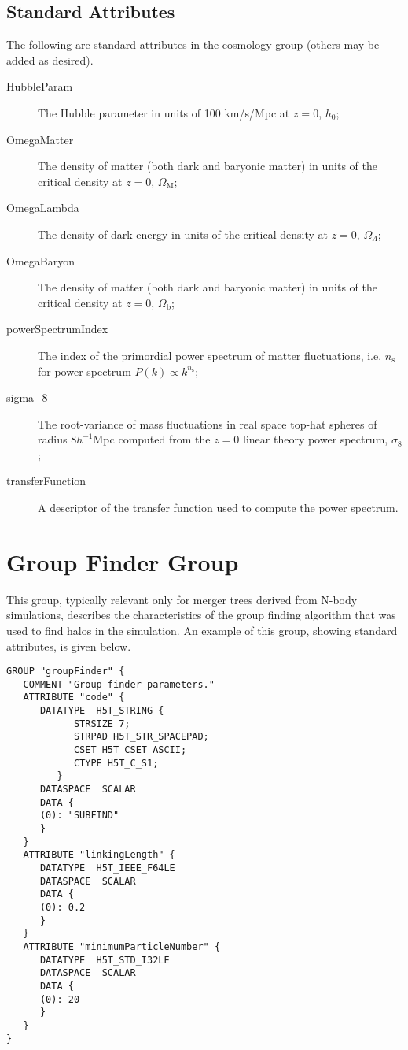 \subsection{Standard Attributes}

The following are standard attributes in the {\normalfont \ttfamily cosmology} group (others may be added as desired).

\begin{description}
 \item [{\normalfont \ttfamily HubbleParam}] The Hubble parameter in units of 100 km/s/Mpc at $z=0$, $h_0$;
 \item [{\normalfont \ttfamily OmegaMatter}] The density of matter (both dark and baryonic matter) in units of the critical density at $z=0$, $\Omega_{\mathrm M}$;
 \item [{\normalfont \ttfamily OmegaLambda}] The density of dark energy in units of the critical density at $z=0$, $\Omega_\Lambda$;
 \item [{\normalfont \ttfamily OmegaBaryon}] The density of matter (both dark and baryonic matter) in units of the critical density at $z=0$, $\Omega_{\mathrm b}$;
 \item [{\normalfont \ttfamily powerSpectrumIndex}] The index of the primordial power spectrum of matter fluctuations, i.e. $n_{\mathrm s}$ for power spectrum $P(k) \propto k^{n_{\mathrm s}}$;
 \item [{\normalfont \ttfamily sigma\_8}] The root-variance of mass fluctuations in real space top-hat spheres of radius $8h^{-1}$Mpc computed from the $z=0$ linear theory power spectrum, $\sigma_8$;
 \item [{\normalfont \ttfamily transferFunction}] A descriptor of the transfer function used to compute the power spectrum.
\end{description}

\section{Group Finder Group}

This group, typically relevant only for merger trees derived from N-body simulations, describes the characteristics of the group finding algorithm that was used to find halos in the simulation. An example of this group, showing standard attributes, is given below.

\begin{verbatim}
GROUP "groupFinder" {
   COMMENT "Group finder parameters."
   ATTRIBUTE "code" {
      DATATYPE  H5T_STRING {
            STRSIZE 7;
            STRPAD H5T_STR_SPACEPAD;
            CSET H5T_CSET_ASCII;
            CTYPE H5T_C_S1;
         }
      DATASPACE  SCALAR
      DATA {
      (0): "SUBFIND"
      }
   }
   ATTRIBUTE "linkingLength" {
      DATATYPE  H5T_IEEE_F64LE
      DATASPACE  SCALAR
      DATA {
      (0): 0.2
      }
   }
   ATTRIBUTE "minimumParticleNumber" {
      DATATYPE  H5T_STD_I32LE
      DATASPACE  SCALAR
      DATA {
      (0): 20
      }
   }
}
\end{verbatim}

